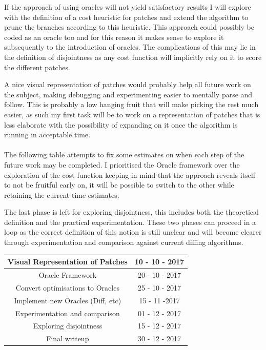 \documentclass[11pt]{article}
\begin{document}
If the approach of using oracles will not yield satisfactory results I will explore with the definition of a cost heuristic
for patches and extend the algorithm to prune the branches according to this heuristic. This approach could 
possibly be coded as an oracle too and for this reason it makes sense to explore it subsequently to the introduction
of oracles. The complications of this may lie in the definition of disjointness 
as any cost function will implicitly rely on it to score the different patches. 

A nice visual representation of patches would probably help all future work on the subject, making debugging and 
experimenting easier to mentally parse and follow. This is probably a low 
hanging fruit that will make picking the rest much easier, as such my first task 
will be to work on a representation of patches that is less elaborate with 
the possibility of expanding on it once the algorithm is running in acceptable 
time.
\\\\
The following table attempts to fix some estimates on when each step of the 
future work may be completed. I prioritised the Oracle framework over the 
exploration of the cost function keeping in mind that the approach reveals 
itself to not be fruitful early on, it will be possible to switch to the other 
while retaining the current time estimates.

The last phase is left for exploring disjointness, this includes both the theoretical 
definition and the practical experimentation. These two 
phases can proceed in a loop as the correct definition of this notion is still 
unclear and will become clearer through experimentation and comparison against 
current diffing algorithms.

\begin{center}
 \begin{tabular} { ||c|c|| }
   \hline Visual Representation of Patches & 10 - 10 - 2017 \\
   \hline
   \hline Oracle Framework & 20 - 10 - 2017 \\ 
   \hline Convert optimisations to Oracles & 25 - 10 - 2017 \\
   \hline Implement new Oracles (Diff, etc) & 15 - 11 -2017 \\ 
   \hline Experimentation and comparison & 01 - 12 - 2017 \\ 
   \hline
   \hline Exploring disjointness & 15 - 12 - 2017 \\
   \hline
   \hline Final writeup & 30 - 12 - 2017 \\
   \hline
 \end{tabular}
\end{center}
\end{document}
